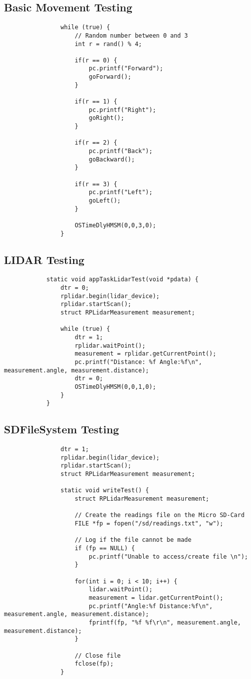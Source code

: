			\subsection{Basic Movement Testing}
			\label{testcode:movementbasic}
			\begin{lstlisting}
				while (true) {
					// Random number between 0 and 3
					int r = rand() % 4;
					
					if(r == 0) {
						pc.printf("Forward");
						goForward();
					}
					
					if(r == 1) {
						pc.printf("Right");
						goRight();
					}
					
					if(r == 2) {
						pc.printf("Back");
						goBackward();
					}
					
					if(r == 3) {
						pc.printf("Left");
						goLeft();
					}

					OSTimeDlyHMSM(0,0,3,0);
				}
			\end{lstlisting}
			
			\subsection{LIDAR Testing}
			\label{testcode:observation1}
			\begin{lstlisting}
			static void appTaskLidarTest(void *pdata) {
				dtr = 0;
				rplidar.begin(lidar_device);
				rplidar.startScan();
				struct RPLidarMeasurement measurement;
				
				while (true) {
					dtr = 1;
					rplidar.waitPoint();
					measurement = rplidar.getCurrentPoint();
					pc.printf("Distance: %f Angle:%f\n", measurement.angle, measurement.distance);
					dtr = 0;
					OSTimeDlyHMSM(0,0,1,0);
				}
			}
			\end{lstlisting}
			
			\subsection{SDFileSystem Testing}
			\label{testcode:filewriting2}
			\begin{lstlisting}
				dtr = 1;
				rplidar.begin(lidar_device);
				rplidar.startScan();
				struct RPLidarMeasurement measurement;
				
				static void writeTest() {
					struct RPLidarMeasurement measurement;

					// Create the readings file on the Micro SD-Card
					FILE *fp = fopen("/sd/readings.txt", "w");
					
					// Log if the file cannot be made
					if (fp == NULL) {
						pc.printf("Unable to access/create file \n");
					}

					for(int i = 0; i < 10; i++) {
						lidar.waitPoint();
						measurement = lidar.getCurrentPoint();
						pc.printf("Angle:%f Distance:%f\n", measurement.angle, measurement.distance);
						fprintf(fp, "%f %f\r\n", measurement.angle, measurement.distance);
					}
					
					// Close file
					fclose(fp);
				}
			\end{lstlisting}
			
